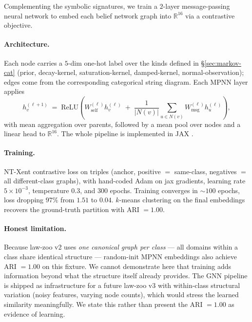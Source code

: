 \documentclass{article}
\begin{document}
Complementing the symbolic signatures, we train a $2$-layer
message-passing neural network \citep{gilmer2017mpnn} to embed each
belief network graph into $\mathbb{R}^{16}$ via a contrastive objective.

\paragraph{Architecture.}
Each node carries a $5$-dim one-hot label over the kinds defined in
\S\ref{sec:markov-cat} (prior, decay-kernel, saturation-kernel,
damped-kernel, normal-observation); edges come from the corresponding
categorical string diagram. Each MPNN layer applies
\begin{equation*}
h_{v}^{(\ell + 1)} \;=\; \mathrm{ReLU}\!\left(W_{\mathrm{self}}^{(\ell)} h_{v}^{(\ell)}
\;+\; \frac{1}{|N(v)|}\sum_{u \in N(v)} W_{\mathrm{msg}}^{(\ell)} h_{u}^{(\ell)}\right),
\end{equation*}
with mean aggregation over parents, followed by a mean pool over
nodes and a linear head to $\mathbb{R}^{16}$. The whole pipeline is
implemented in JAX \citep{bradbury2018jax}.

\paragraph{Training.}
NT-Xent contrastive loss \citep{chen2020simclr} on triples
(anchor, positive $=$ same-class, negatives $=$ all different-class
graphs), with hand-coded Adam \citep{kingma2014adam} on jax gradients,
learning rate $5 \times 10^{-3}$, temperature $0.3$, and $300$ epochs.
Training converges in $\sim 100$ epochs, loss dropping $97\%$ from
$1.51$ to $0.04$. $k$-means \citep{macqueen1967kmeans} clustering on
the final embeddings recovers the ground-truth partition with
ARI $= 1.00$.

\paragraph{Honest limitation.}
\label{sec:gnn-limit}
Because law-zoo v2 uses \emph{one canonical graph per class} --- all
domains within a class share identical structure --- random-init MPNN
embeddings also achieve ARI $= 1.00$ on this fixture. We cannot
demonstrate here that training adds information beyond what the
structure itself already provides. The GNN pipeline is shipped as
infrastructure for a future law-zoo v3 with within-class structural
variation (noisy features, varying node counts), which would stress
the learned similarity meaningfully. We state this rather than
present the ARI $= 1.00$ as evidence of learning.
\end{document}
